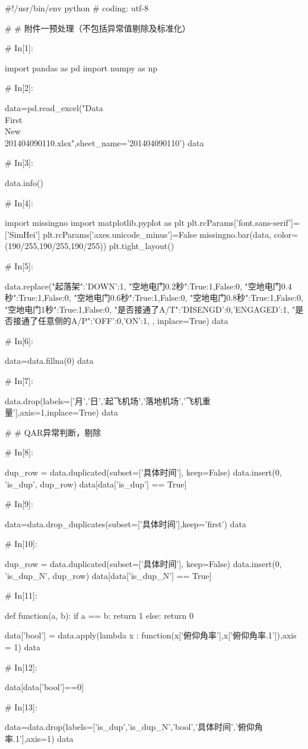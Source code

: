 \documentclass{MathorCupModeling}
\begin{document}
\begin{python}
#!/usr/bin/env python
# coding: utf-8

# # 附件一预处理（不包括异常值剔除及标准化）

# In[1]:


import pandas as pd
import numpy as np


# In[2]:


data=pd.read_excel("Data\\First\\New\\201404090110.xlsx",sheet_name='201404090110')
data


# In[3]:


data.info()


# In[4]:


import missingno
import matplotlib.pyplot as plt
plt.rcParams['font.sans-serif']=['SimHei']
plt.rcParams['axes.unicode_minus']=False
missingno.bar(data, color=(190/255,190/255,190/255))
plt.tight_layout()


# In[5]:


data.replace({"起落架":{'DOWN':1},
              "空地电门0.2秒":{True:1,False:0},
              "空地电门0.4秒":{True:1,False:0},
              "空地电门0.6秒":{True:1,False:0},
              "空地电门0.8秒":{True:1,False:0},
              "空地电门1秒":{True:1,False:0},
              "是否接通了A/T":{'DISENGD':0,'ENGAGED':1},
              "是否接通了任意侧的A/P":{'OFF':0,'ON':1},
              }, inplace=True)
data


# In[6]:


data=data.fillna(0)
data


# In[7]:


data.drop(labels=['月','日','起飞机场','落地机场','飞机重量'],axis=1,inplace=True)
data


# # QAR异常判断，剔除

# In[8]:


dup_row = data.duplicated(subset=['具体时间'], keep=False)
data.insert(0, 'is_dup', dup_row)
data[data['is_dup'] == True]


# In[9]:


data=data.drop_duplicates(subset=['具体时间'],keep='first')
data


# In[10]:


dup_row = data.duplicated(subset=['具体时间'], keep=False)
data.insert(0, 'is_dup_N', dup_row)
data[data['is_dup_N'] == True]


# In[11]:


def function(a, b):
    if a == b:
        return 1
    else:
        return 0


data['bool'] = data.apply(lambda x : function(x['俯仰角率'],x['俯仰角率.1']),axis = 1)
data


# In[12]:


data[data['bool']==0]


# In[13]:


data=data.drop(labels=['is_dup','is_dup_N','bool','具体时间','俯仰角率.1'],axis=1)
data


\end{python}
\end{document}
